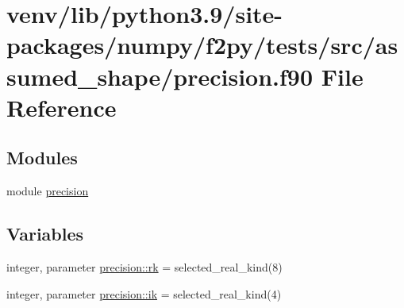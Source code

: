 \hypertarget{precision_8f90}{}\section{venv/lib/python3.9/site-\/packages/numpy/f2py/tests/src/assumed\+\_\+shape/precision.f90 File Reference}
\label{precision_8f90}
\subsection*{Modules}
\begin{DoxyCompactItemize}
\item 
module \hyperlink{namespaceprecision}{precision}
\end{DoxyCompactItemize}
\subsection*{Variables}
\begin{DoxyCompactItemize}
\item 
integer, parameter \hyperlink{namespaceprecision_a5baca5394ac04d2c475123ef13c0e9cb}{precision\+::rk} = selected\+\_\+real\+\_\+kind(8)
\item 
integer, parameter \hyperlink{namespaceprecision_a83936b6a5d1f3660620c38a2ad74f532}{precision\+::ik} = selected\+\_\+real\+\_\+kind(4)
\end{DoxyCompactItemize}
